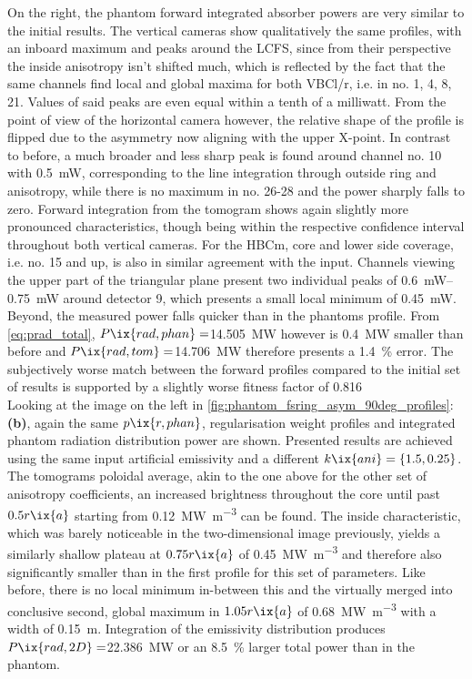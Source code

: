                 On the right, the phantom forward integrated absorber powers are very similar to the initial results. The vertical cameras show qualitatively the same profiles, with an inboard maximum and peaks around the LCFS, since from their perspective the inside anisotropy isn't shifted much, which is reflected by the fact that the same channels find local and global maxima for both VBCl/r, i.e. in no. 1, 4, 8, 21. Values of said peaks are even equal within a tenth of a milliwatt. From the point of view of the horizontal camera however, the relative shape of the profile is flipped due to the asymmetry now aligning with the upper X-point. In contrast to before, a much broader and less sharp peak is found around channel no. 10 with \SI{0.5}{\milli\watt}, corresponding to the line integration through outside ring and anisotropy, while there is no maximum in no. 26-28 and the power sharply falls to zero. Forward integration from the tomogram shows again slightly more pronounced characteristics, though being within the respective confidence interval throughout both vertical cameras. For the HBCm, core and lower side coverage, i.e. no. 15 and up, is also in similar agreement with the input. Channels viewing the upper part of the triangular plane present two individual peaks of \SIrange{0.6}{0.75}{\milli\watt} around detector 9, which presents a small local minimum of \SI{0.45}{\milli\watt}. Beyond, the measured power falls quicker than in the phantoms profile. From \cref{eq:prad_total}, $P\ix{rad,phan}=$\SI{14.505}{\mega\watt} however is \SI{0.4}{\mega\watt} smaller than before and $P\ix{rad,tom}=$\SI{14.706}{\mega\watt} therefore presents a \SI{1.4}{\percent} error. The subjectively worse match between the forward profiles compared to the initial set of results is supported by a slightly worse fitness factor of \SI{0.816}{\arbitraryunit}\\%
                Looking at the image on the left in \cref{fig:phantom_fsring_asym_90deg_profiles}:\textbf{(b)}, again the same $p\ix{r,phan}$, regularisation weight profiles and integrated phantom radiation distribution power are shown. Presented results are achieved using the same input artificial emissivity and a different $k\ix{ani}=\left\{1.5, 0.25\right\}$. The tomograms poloidal average, akin to the one above for the other set of anisotropy coefficients, an increased brightness throughout the core until past $0.5r\ix{a}$ starting from \SI{0.12}{\mega\watt\per\cubic\meter} can be found. The inside characteristic, which was barely noticeable in the two-dimensional image previously, yields a similarly shallow plateau at $0.75r\ix{a}$ of \SI{0.45}{\mega\watt\per\cubic\meter} and therefore also significantly smaller than in the first profile for this set of parameters. Like before, there is no local minimum in-between this and the virtually merged into conclusive second, global maximum in $1.05r\ix{a}$ of \SI{0.68}{\mega\watt\per\cubic\meter} with a width of \SI{0.15}{\meter}. Integration of the emissivity distribution produces $P\ix{rad,2D}=$\SI{22.386}{\mega\watt} or an \SI{8.5}{\percent} larger total power than in the phantom.\\%
